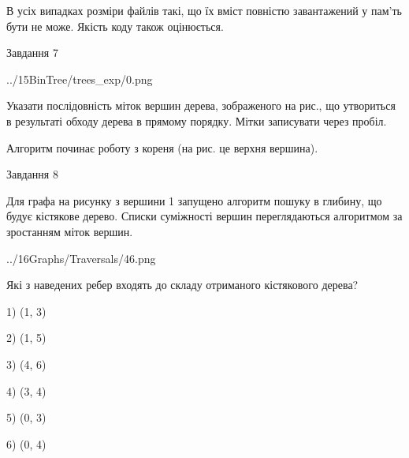 \documentclass[12pt, ukrainian]{article}
\begin{document}
{В усіх випадках розміри файлів такі, що їх вміст повністю завантажений у пам'ть бути не може. Якість коду також оцінюється.



\vspace{10mm}\par

\newpage
\begin{minipage}[t]{9.7cm}
               
{\begin{center}Завдання {7}\end{center}}
\vspace{-4mm}

\begin{center}
	{../15BinTree/trees_exp/0.png}
\end{center}
Указати послідовність міток вершин дерева, зображеного на рис., що утвориться в результаті обходу дерева в прямому порядку. Мітки записувати через пробіл.\par Алгоритм починає роботу з кореня (на рис. це верхня вершина).\par

\end{minipage}
\vline \hspace{8mm}
\begin{minipage}[t]{8.0cm}
               
{\begin{center}Завдання {8}\end{center}}
\vspace{-4mm}
Для графа на рисунку з вершини 1 запущено алгоритм пошуку в глибину, що будує кістякове дерево. Списки суміжності вершин переглядаються алгоритмом за зростанням міток вершин.\par
\begin{center}
	{../16Graphs/Traversals/46.png}
\end{center}
\par Які з наведених ребер входять до складу отриманого кістякового дерева?\par
1) (1, 3)\par
2) (1, 5)\par
3) (4, 6)\par
4) (3, 4)\par
5) (0, 3)\par
6) (0, 4)\par
{\vskip 15pt} \par


\end{minipage}}
\end{document}
